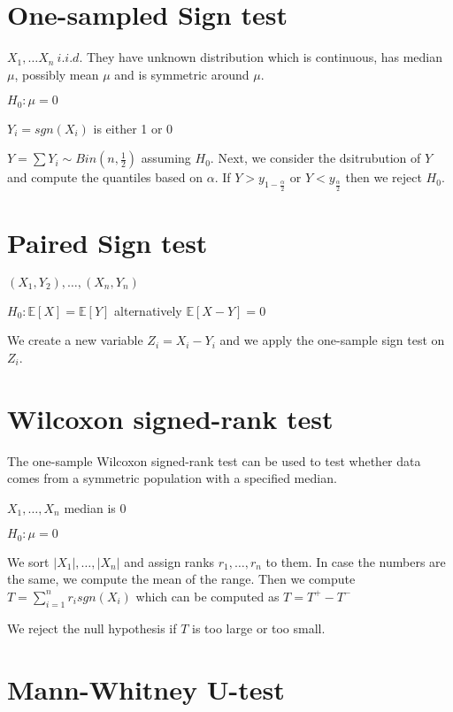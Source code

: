 \section{One-sampled Sign test}

$X_1, \dots X_n \ i.i.d. $ They have unknown distribution which is continuous, has median $\mu$, possibly mean $\mu$ and is symmetric around $\mu$.

$H_0: \mu = 0$

$Y_i = sgn(X_i)$ is either 1 or 0


$Y = \sum Y_i \sim Bin(n, \frac{1}{2})$ assuming $H_0$. Next, we consider the dsitrubution of $Y$ and compute the quantiles based on $\alpha$. If $Y > y_{1-\frac{\alpha}{2}}$ or $Y < y_{\frac{\alpha}{2}}$ then we reject $H_0$.

\section{Paired Sign test}

$(X_1, Y_2), \dots , (X_n, Y_n)$

$H_0 : \mathbb{E}[X]  = \mathbb{E}[Y]$ alternatively $\mathbb{E}[X-Y] = 0$

We create a new variable $Z_i = X_i - Y_i $ and we apply the one-sample sign test on $Z_i$.

\section{Wilcoxon signed-rank test}

The one-sample Wilcoxon signed-rank test can be used to test whether data comes from a symmetric population with a specified median.

$X_1, \dots, X_n$ median is $0$

$H_0: \mu = 0$

We sort $\vert X_1 \vert, \dots, \vert X_n \vert$ and assign ranks $r_1, \dots, r_n$ to them. In case the numbers are the same, we compute the mean of the range. Then we compute $T = \sum_{i=1}^n r_i sgn(X_i)$ which can be computed as $T = T^+ - T^-$

We reject the null hypothesis if $T$ is too large or too small.

\section{Mann-Whitney U-test}

